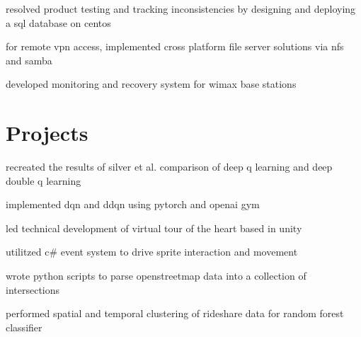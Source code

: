 \begin{minipage}[t]{0.78\textwidth}
\begin{tightitemize}
    \item resolved product testing and tracking inconsistencies by designing and deploying a sql database on centos
    \item for remote vpn access, implemented cross platform file server solutions via nfs and samba
    \item developed monitoring and recovery system for wimax base stations
\end{tightitemize}

\section{Projects}
\descript{}
\begin{tightitemize}
    \item recreated the results of silver et al. comparison of deep q learning and deep double q learning 
    \item implemented dqn and ddqn using pytorch and openai gym
\end{tightitemize}

\descript{}
\begin{tightitemize}
    \item led technical development of virtual tour of the heart based in unity
    \item utilitzed c\# event system to drive sprite interaction and movement
\end{tightitemize}

\descript{}
\begin{tightitemize}
    \item wrote python scripts to parse openstreetmap data into a collection of intersections
    \item performed spatial and temporal clustering of rideshare data for random forest classifier
\end{tightitemize}



\end{minipage} %
\vspace*{\fill}